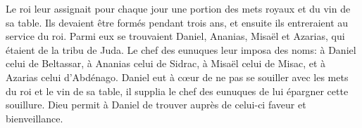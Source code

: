 Le roi leur assignait pour chaque jour une portion des mets royaux et du vin de sa table.
Ils devaient être formés pendant trois ans,
	et ensuite ils entreraient au service du roi.
Parmi eux se trouvaient Daniel,
	Ananias, Misaël et Azarias, qui étaient de la tribu de Juda.
Le chef des eunuques leur imposa des noms:
	à Daniel celui de Beltassar, à Ananias celui de Sidrac,
	à Misaël celui de Misac, et à Azarias celui d’Abdénago.
Daniel eut à cœur de ne pas se souiller avec les mets du roi et le vin de sa table,
	il supplia le chef des eunuques de lui épargner cette souillure.
	Dieu permit à Daniel de trouver auprès de celui-ci faveur et bienveillance.
